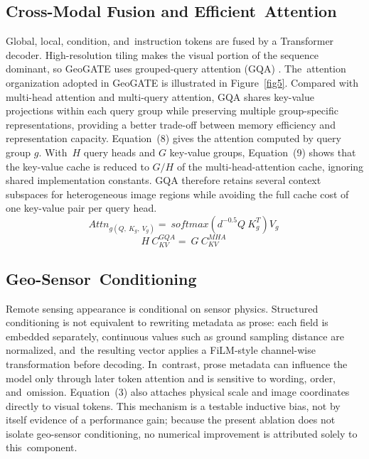 \documentclass[applsci,article,accept,moreauthors]{Definitions/mdpi}
\begin{document}
\subsection{Cross-Modal Fusion and Efficient~Attention}

Global, local, condition, and~instruction tokens are fused by a Transformer decoder. High-resolution tiling makes the visual portion of the sequence dominant, so GeoGATE uses grouped-query attention (GQA) \citep{ref23}. The~attention organization adopted in GeoGATE is illustrated in Figure~\ref{fig5}. Compared with multi-head attention and multi-query attention, GQA shares key-value projections within each query group while preserving multiple group-specific representations, providing a better trade-off between memory efficiency and representation capacity. Equation~(8) gives the attention computed by query group $g$. With~$H$ query heads and $G$ key-value groups, Equation~(9) shows that the key-value cache is reduced to $G/H$ of the multi-head-attention cache, ignoring shared implementation constants. GQA therefore retains several context subspaces for heterogeneous image regions while avoiding the full cache cost of one key-value pair per query head.
\begin{equation}
Attn_{g\left( Q,\ K_{g},\ V_{g} \right)} = \ softmax\left( d^{- 0.5}Q\ K_{g}^{T} \right)V_{g}\
\label{eq8}
\end{equation}
\begin{equation}
H\ C_{KV}^{GQA} = \ G\ C_{KV}^{MHA}\
\label{eq9}
\end{equation}



\subsection{Geo-Sensor~Conditioning}

Remote sensing appearance is conditional on sensor physics. Structured conditioning is not equivalent to rewriting metadata as prose: each field is embedded separately, continuous values such as ground sampling distance are normalized, and~the resulting vector applies a FiLM-style channel-wise transformation before decoding. In~contrast, prose metadata can influence the model only through later token attention and is sensitive to wording, order, and~omission. Equation~(3) also attaches physical scale and image coordinates directly to visual tokens. This mechanism is a testable inductive bias, not by itself evidence of a performance gain; because the present ablation does not isolate geo-sensor conditioning, no numerical improvement is attributed solely to this~component.
\end{document}
